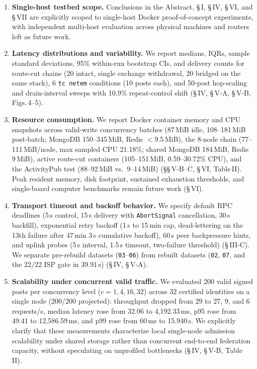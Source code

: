 \documentclass[10pt,a4paper]{article}
\begin{document}
\begin{enumerate}
  \item \textbf{Single-host testbed scope.}
  Conclusions in the Abstract, \S\,I, \S\,IV, \S\,VI, and \S\,VII are explicitly scoped to single-host Docker proof-of-concept experiments, with independent multi-host evaluation across physical machines and routers left as future work.

  \item \textbf{Latency distributions and variability.}
  We report medians, IQRs, sample standard deviations, 95\% within-run bootstrap CIs, and delivery counts for route-cut chains (20 intact, single exchange withdrawal, 20 bridged on the same stack), 6 \texttt{tc netem} conditions (10 posts each), and 50-post hop-scaling and drain-interval sweeps with 10.9\% repeat-control shift (\S\,IV, \S\,V-A, \S\,V-B, Figs.\,4--5).

  \item \textbf{Resource consumption.}
  We report Docker container memory and CPU snapshots across valid-write concurrency batches (87\,MiB idle, 108--181\,MiB post-batch; MongoDB 150--345\,MiB, Redis $<$9.5\,MiB), the 8-node chain (77--111\,MiB/node, max sampled CPU 21.18\%; shared MongoDB 184\,MiB, Redis 9\,MiB), active route-cut containers (105--151\,MiB, 0.59--30.72\% CPU), and the ActivityPub test (88--92\,MiB vs.\ 9--14\,MiB) (\S\S\,V-B--C, \S\,VI, Table\,II). Peak resident memory, disk footprint, sustained exhaustion thresholds, and single-board computer benchmarks remain future work (\S\,VI).

  \item \textbf{Transport timeout and backoff behavior.}
  We specify default RPC deadlines (5\,s control, 15\,s delivery with \texttt{AbortSignal} cancellation, 30\,s backfill), exponential retry backoff (1\,s to 15\,min cap, dead-lettering on the 13th failure after 47\,min 3\,s cumulative backoff), 60\,s peer backpressure hints, and uplink probes (5\,s interval, 1.5\,s timeout, two-failure threshold) (\S\,III-C). We separate pre-rebuild datasets (\texttt{03}--\texttt{06}) from rebuilt datasets (\texttt{02}, \texttt{07}, and the 22/22 ISP gate in 39.91\,s) (\S\,IV, \S\,V-A).

  \item \textbf{Scalability under concurrent valid traffic.}
  We evaluated 200 valid signed posts per concurrency level ($c = 1, 4, 16, 32$) across 32 certified identities on a single node (200/200 projected): throughput dropped from 29 to 27, 9, and 6\,requests/s, median latency rose from 32.06 to 4,192.33\,ms, p95 rose from 49.41 to 12,586.59\,ms, and p99 rose from 60\,ms to 15.940\,s. We explicitly clarify that these measurements characterize local single-node admission scalability under shared storage rather than concurrent end-to-end federation capacity, without speculating on unprofiled bottlenecks (\S\,IV, \S\,V-B, Table\,II).


\end{enumerate}
\end{document}
